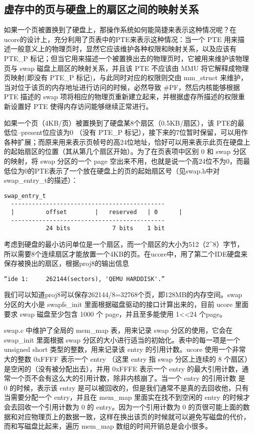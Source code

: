 \subsection{虚存中的页与硬盘上的扇区之间的映射关系}\label{ux865aux5b58ux4e2dux7684ux9875ux4e0eux786cux76d8ux4e0aux7684ux6247ux533aux4e4bux95f4ux7684ux6620ux5c04ux5173ux7cfb}

如果一个页被置换到了硬盘上，那操作系统如何能简捷来表示这种情况呢？在ucore的设计上，充分利用了页表中的PTE来表示这种情况：当一个
PTE
用来描述一般意义上的物理页时，显然它应该维护各种权限和映射关系，以及应该有
PTE\_P
标记；但当它用来描述一个被置换出去的物理页时，它被用来维护该物理页与
swap 磁盘上扇区的映射关系，并且该 PTE 不应该由 MMU
将它解释成物理页映射(即没有 PTE\_P 标记)，与此同时对应的权限则交由
mm\_struct 来维护，当对位于该页的内存地址进行访问的时候，必然导致
\#PF，然后内核能够根据 PTE 描述的 swap
项将相应的物理页重新建立起来，并根据虚存所描述的权限重新设置好 PTE
使得内存访问能够继续正常进行。

如果一个页（4KB/页）被置换到了硬盘某8个扇区（0.5KB/扇区），该
PTE的最低位--present位应该为0 （没有 PTE\_P
标记），接下来的7位暂时保留，可以用作各种扩展；而原来用来表示页帧号的高24位地址，恰好可以用来表示此页在硬盘上的起始扇区的位置（其从第几个扇区开始）。为了在页表项中区别
0 和 swap 分区的映射，将 swap 分区的一个 page
空出来不用，也就是说一个高24位不为0，而最低位为0的PTE表示了一个放在硬盘上的页的起始扇区号（见swap.h中对swap\_entry\_t的描述）：

\begin{lstlisting}
swap_entry_t
  --------------------------------------------
  |         offset        |   reserved   | 0      |
  --------------------------------------------
            24 bits            7 bits    1 bit
\end{lstlisting}

考虑到硬盘的最小访问单位是一个扇区，而一个扇区的大小为512（2\^{}8）字节，所以需要8个连续扇区才能放置一个4KB的页。在ucore中，用了第二个IDE硬盘来保存被换出的扇区，根据proj8的输出信息

\begin{lstlisting}
“ide 1:     262144(sectors), 'QEMU HARDDISK'.”
\end{lstlisting}

我们可以知道proj8可以保存262144/8=32768个页，即128MB的内存空间。swap
分区的大小是 swapfs\_init 里面根据磁盘驱动的接口计算出来的，目前 ucore
里面要求 swap 磁盘至少包含 1000 个 page，并且至多能使用
1\textless{}\textless{}24 个page。

swap.c 中维护了全局的 mem\_map 表，用来记录 swap 分区的使用，它会在
swap\_init 里面根据 swap 分区的大小进行适当的初始化。表中的每一项是一个
unsigned short 类型的整数，用来记录该 entry 的引用计数。ucore
使用一个非常大的整数 0xFFFF 表示一个 entry （这里 entry 指 swap
分区上连续的 8 个扇区）是空闲的（没有被分配出去），并用 0xFFFE 表示一个
entry
的最大引用计数，通常一个页不会有这么大的引用计数，除非内核崩了。当一个
entry 的引用计数 是 0 的时候，表示该 entry
是可以被回收的，但是我们通常不是真的去回收他，只有当需要分配一个
entry，并且在 mem\_map 里面实在找不到空闲的 entry
的时候才会去回收一个引用计数为 0 的 entry。因为一个引用计数为 0
的页很可能上面的数据和对应物理页上的数据一致，这样在换出该页的时候就可以避免写磁盘的代价，而和写磁盘比起来，遍历
mem\_map 数组的时间开销总是会小很多。

